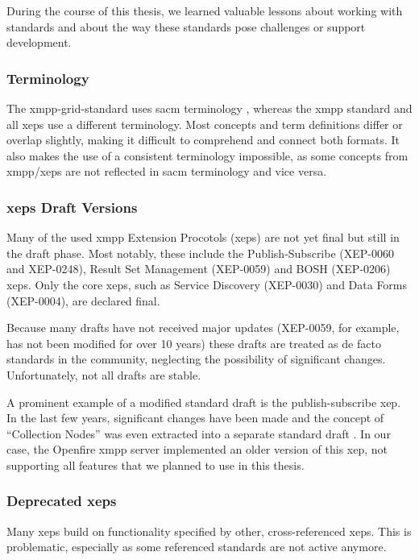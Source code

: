 During the course of this thesis, we learned valuable lessons about working with standards and about the way these standards pose challenges or support development.

\subsubsection{Terminology}

The \gls{xmpp-grid-standard} uses \gls{sacm} terminology \cite{ietf-sacm-terminology-14}, whereas the \gls{xmpp} standard and all \glspl{xep} use a different terminology.
Most concepts and term definitions differ or overlap slightly, making it difficult to comprehend and connect both formats.
It also makes the use of a consistent terminology impossible, as some concepts from \gls{xmpp}/\glspl{xep} are not reflected in \gls{sacm} terminology and vice versa.

\subsubsection{\glspl{xep} Draft Versions}
Many of the used \gls{xmpp} Extension Procotols (\glspl{xep}) are not yet final but still in the draft phase.
Most notably, these include the Publish-Subscribe (XEP-0060 and XEP-0248), Result Set Management (XEP-0059) and BOSH (XEP-0206) \glspl{xep}.
Only the core \glspl{xep}, such as Service Discovery (XEP-0030) and Data Forms (XEP-0004), are declared final.

Because many drafts have not received major updates (XEP-0059, for example, has not been modified for over 10 years) these drafts are treated as de facto standards in the community, neglecting the possibility of significant changes.
Unfortunately, not all drafts are stable.

A prominent example of a modified standard draft is the \gls{publish-subscribe} \gls{xep}.
In the last few years, significant changes have been made and the concept of ``Collection Nodes'' was even extracted into a separate standard draft \cite{xep-0248}.
In our case, the Openfire \gls{xmpp} server implemented an older version of this \gls{xep}, not supporting all features that we planned to use in this thesis.

\subsubsection{Deprecated \glspl{xep}}

Many \glspl{xep} build on functionality specified by other, cross-referenced \glspl{xep}.
This is problematic, especially as some referenced standards are not active anymore.

